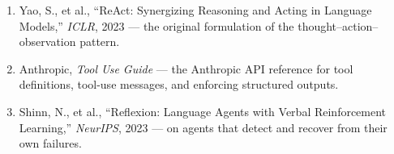 \begin{small}
\begin{enumerate}
\item Yao, S., et al., ``ReAct: Synergizing Reasoning and Acting in Language Models,'' \emph{ICLR}, 2023 — the original formulation of the thought–action–observation pattern.
\item Anthropic, \emph{Tool Use Guide} — the Anthropic API reference for tool definitions, tool-use messages, and enforcing structured outputs.
\item Shinn, N., et al., ``Reflexion: Language Agents with Verbal Reinforcement Learning,'' \emph{NeurIPS}, 2023 — on agents that detect and recover from their own failures.
\end{enumerate}
\end{small}
